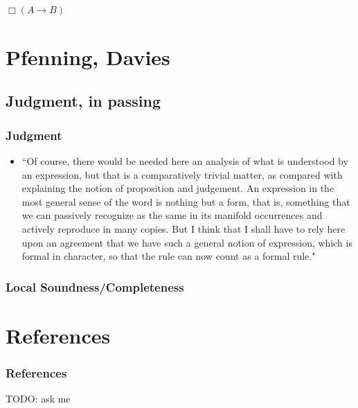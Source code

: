 \documentclass[aspectratio=169]{beamer}
\begin{document}
\begin{frame}
    $\Box(A → B)$
\end{frame}
\section{Pfenning, Davies}
\subsection{Judgment, in passing}
\begin{frame}
    \frametitle{Judgment}
    \begin{itemize}
        \item ``Of course, there would be needed here an analysis of what is understood by an expression, but that is a comparatively trivial matter, as compared with explaining the notion of proposition and judgement.
            An expression in the  most general sense of the word is nothing but a form, that is, something that we can passively recognize as the same in its manifold occurrences and actively reproduce in many copies.
            But I think that I shall have to rely here upon an agreement that we have such a general notion of expression, which is formal in character, so that the rule can now count as a formal rule."
    \end{itemize}
\end{frame}
\begin{frame}
    \frametitle{Local Soundness/Completeness}
\end{frame}
\section*{References}
\begin{frame}[allowframebreaks]
    \frametitle{References}
    \begin{thebibliography}{00}
        TODO: ask me
    \end{thebibliography}
\end{frame}
\end{document}
